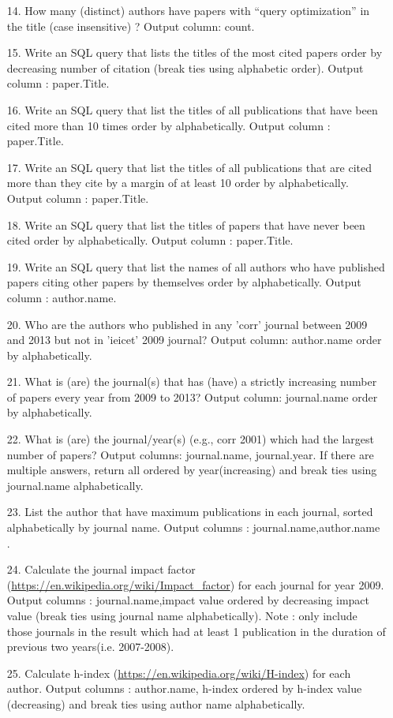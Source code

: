 \documentclass[10pt]{article}
\begin{document}
\begin{enumerate}
\item
[14.] How many (distinct) authors have papers with “query optimization” in the title (case insensitive) ? Output column: count.
\item
[15.] Write an SQL query that lists the titles of the most cited papers order by decreasing number of citation (break ties using alphabetic order). Output column : paper.Title.
\item
[16.] Write an SQL query that  list the titles of all publications that have been cited more than 10 times order by alphabetically. Output column : paper.Title.
\item
[17.] Write an SQL query that list the titles of all publications that are cited more than they cite by a margin of at least 10 order by alphabetically. Output column : paper.Title.
\item
[18.] Write an SQL query that list the titles of papers that have never been cited order by alphabetically. Output column : paper.Title.
\item
[19.] Write an SQL query that list the names of all authors who have published papers citing other papers by themselves order by alphabetically. Output column : author.name.
\item
[20.] Who are the authors who published in any 'corr' journal between 2009 and 2013 but not in 'ieicet' 2009 journal? Output column: author.name order by alphabetically.
\item
[21.] What is (are) the journal(s) that has (have) a strictly increasing number of papers every year from 2009 to 2013? Output column: journal.name order by alphabetically.
\item
[22.] What is (are) the journal/year(s) (e.g., corr 2001) which had the largest number of papers? Output columns: journal.name, journal.year. If there are multiple answers, return all ordered by year(increasing) and break ties using journal.name alphabetically.
\item
[23.] List the author that have maximum publications in each journal, sorted alphabetically by journal name. Output columns : journal.name,author.name .  
\item
[24.] Calculate the journal impact factor (\url{https://en.wikipedia.org/wiki/Impact_factor}) for each journal for year 2009. Output columns : journal.name,impact value ordered by decreasing impact value (break ties using journal name alphabetically). Note : only include those journals in the result which had at least 1 publication in the duration of previous two years(i.e. 2007-2008).
\item
[25.] Calculate h-index (\url{https://en.wikipedia.org/wiki/H-index}) for each author. Output columns : author.name, h-index ordered by h-index value (decreasing) and break ties using author name alphabetically.


\end{enumerate}
\end{document}
